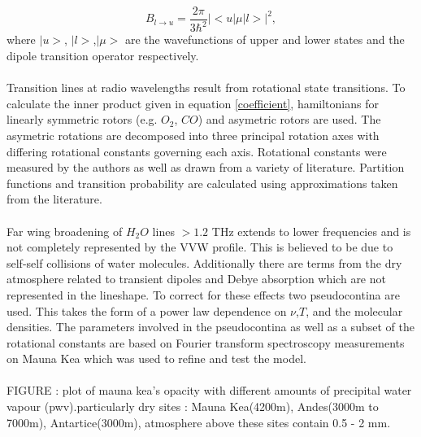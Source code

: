 \begin{equation}\label{coefficient}
B_{l \to u} = \frac{2\pi}{3\hbar^2} |<u|\mu|l>|^2,
\end{equation}
where $|u>$, $|l>$,$|\mu>$ are the wavefunctions of upper and lower states and the dipole transition operator respectively. \\
~\\
Transition lines at radio wavelengths result from rotational state transitions.  To calculate the inner product given in equation \ref{coefficient}, hamiltonians for linearly  symmetric rotors (e.g. $O_2$, $CO$) and asymetric rotors are used. The asymetric rotations are decomposed into three principal rotation axes with differing rotational constants governing each axis. Rotational constants were measured by the authors as well as drawn from a variety of literature. Partition functions and transition probability are calculated using approximations taken from the literature.\\
~\\
Far wing broadening of $H_2O$ lines $> 1.2$ THz extends to lower frequencies and is not completely represented by the VVW profile. This is believed to be due to self-self collisions of water molecules. Additionally there are terms from the dry atmosphere related to transient dipoles and Debye absorption which are not represented in the lineshape. To correct for these effects two pseudocontina are used. This takes the form of a power law dependence on $\nu$,$T$, and the molecular densities. The parameters involved in the pseudocontina as well as a subset of the rotational constants are based on Fourier transform spectroscopy measurements on Mauna Kea which was used to refine and test the model.\\
 ~\\
FIGURE : plot of mauna kea's opacity with different amounts of precipital water vapour (pwv).particularly dry sites : Mauna Kea(4200m), Andes(3000m to 7000m), Antartice(3000m), atmosphere above these sites contain 0.5 - 2 mm. 

